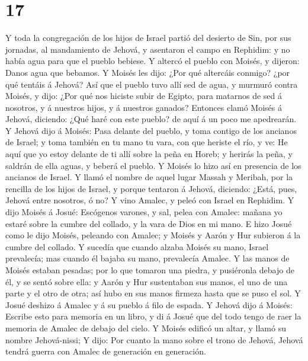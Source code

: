 \hypertarget{section-16}{%
\section{17}\label{section-16}}

 Y toda la congregación de los hijos de Israel partió del
desierto de Sin, por sus jornadas, al mandamiento de Jehová, y asentaron
el campo en Rephidim: y no había agua para que el pueblo bebiese.
 Y altercó el pueblo con Moisés, y dijeron: Danos agua que
bebamos. Y Moisés les dijo: ¿Por qué altercáis conmigo? ¿por qué tentáis
á Jehová?  Así que el pueblo tuvo allí sed de agua, y
murmuró contra Moisés, y dijo: ¿Por qué nos hiciste subir de Egipto,
para matarnos de sed á nosotros, y á nuestros hijos, y á nuestros
ganados?  Entonces clamó Moisés á Jehová, diciendo: ¿Qué
haré con este pueblo? de aquí á un poco me apedrearán.  Y
Jehová dijo á Moisés: Pasa delante del pueblo, y toma contigo de los
ancianos de Israel; y toma también en tu mano tu vara, con que heriste
el río, y ve:  He aquí que yo estoy delante de ti allí
sobre la peña en Horeb; y herirás la peña, y saldrán de ella aguas, y
beberá el pueblo. Y Moisés lo hizo así en presencia de los ancianos de
Israel.  Y llamó el nombre de aquel lugar Massah y
Meribah, por la rencilla de los hijos de Israel, y porque tentaron á
Jehová, diciendo: ¿Está, pues, Jehová entre nosotros, ó no?
 Y vino Amalec, y peleó con Israel en Rephidim.
 Y dijo Moisés á Josué: Escógenos varones, y sal, pelea
con Amalec: mañana yo estaré sobre la cumbre del collado, y la vara de
Dios en mi mano.  E hizo Josué como le dijo Moisés,
peleando con Amalec; y Moisés y Aarón y Hur subieron á la cumbre del
collado.  Y sucedía que cuando alzaba Moisés su mano,
Israel prevalecía; mas cuando él bajaba su mano, prevalecía Amalec.
 Y las manos de Moisés estaban pesadas; por lo que
tomaron una piedra, y pusiéronla debajo de él, y se sentó sobre ella: y
Aarón y Hur sustentaban sus manos, el uno de una parte y el otro de
otra; así hubo en sus manos firmeza hasta que se puso el sol.
 Y Josué deshizo á Amalec y á su pueblo á filo de espada.
 Y Jehová dijo á Moisés: Escribe esto para memoria en un
libro, y di á Josué que del todo tengo de raer la memoria de Amalec de
debajo del cielo.  Y Moisés edificó un altar, y llamó su
nombre Jehová-nissi;  Y dijo: Por cuanto la mano sobre el
trono de Jehová, Jehová tendrá guerra con Amalec de generación en
generación.

